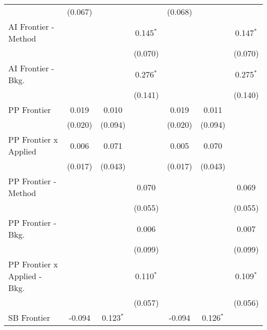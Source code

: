 \begin{tabular}{lcccccc}
                                & (0.067)       &              &              & (0.068)       &              &   \\   
   AI Frontier - Method         &               &              & 0.145$^{*}$  &               &              & 0.147$^{*}$\\   
                                &               &              & (0.070)      &               &              & (0.070)\\   
   AI Frontier - Bkg.           &               &              & 0.276$^{*}$  &               &              & 0.275$^{*}$\\   
                                &               &              & (0.141)      &               &              & (0.140)\\   
   PP Frontier                  & 0.019         & 0.010        &              & 0.019         & 0.011        &   \\   
                                & (0.020)       & (0.094)      &              & (0.020)       & (0.094)      &   \\   
   PP Frontier x Applied        & 0.006         & 0.071        &              & 0.005         & 0.070        &   \\   
                                & (0.017)       & (0.043)      &              & (0.017)       & (0.043)      &   \\   
   PP Frontier - Method         &               &              & 0.070        &               &              & 0.069\\   
                                &               &              & (0.055)      &               &              & (0.055)\\   
   PP Frontier - Bkg.           &               &              & 0.006        &               &              & 0.007\\   
                                &               &              & (0.099)      &               &              & (0.099)\\   
   PP Frontier x Applied - Bkg. &               &              & 0.110$^{*}$  &               &              & 0.109$^{*}$\\   
                                &               &              & (0.057)      &               &              & (0.056)\\   
   SB Frontier                  & -0.094        & 0.123$^{*}$  &              & -0.094        & 0.126$^{*}$  &   \\   

\end{tabular}
